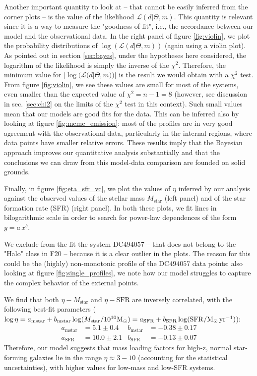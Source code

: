 Another important quantity to look at -- that cannot be easily inferred from the corner plots -- is the value of the likelihood $\mathcal{L}(d|\Theta,m)$. This quantity is relevant since it is a way to measure the "goodness of fit", i.e., the accordance between our model and the observational data. In the right panel of figure \ref{fig:violin}, we plot the probability distributions of $\log(\mathcal{L}(d|\Theta,m))$ (again using a violin plot). As pointed out in section \ref{sec:bayes}, under the hypotheses here considered, the logarithm of the likelihood is simply the inverse of the $\chi^2$. Therefore, the minimum value for $|\log(\mathcal{L}(d|\Theta,m))|$ is the result we would obtain with a $\chi^2$ test. From figure \ref{fig:violin}, we see these values are small for most of the systems, even smaller than the expected value of $\chi^2=n-1=8$ (however, see discussion in sec. \ref{sec:chi2} on the limits of the $\chi^2$ test in this context). Such small values mean that our models are good fits for the data. This can be inferred also by looking at figure \ref{fig:mcmc_emission}: most of the profiles are in very good agreement with the observational data, particularly in the internal regions, where data points have smaller relative errors. These results imply that the Bayesian approach improves our quantitative analysis substantially and that the conclusions we can draw from this model-data comparison are founded on solid grounds.

Finally, in figure \ref{fig:eta_sfr_vc}, we plot the values of $\eta$ inferred by our analysis against the observed values of the stellar mass $M_\mathrm{star}$ (left panel) and of the star formation rate (SFR) (right panel). In both these plots, we fit lines in bilogarithmic scale in order to search for power-law dependences of the form $y=a\,x^b$. 

We exclude from the fit the system DC$494057$ -- that does not belong to the "\CII Halo" class in F20 \citep{Fujimoto:2020qzo} -- because it is a clear outlier in the plots.
%
The reason for this could be the (highly) non-monotonic profile of the DC$494057$ data points: also looking at figure \ref{fig:single_profiles}, we note how our model struggles to capture the complex behavior of the external points. 

We find that both $\eta-M_\mathrm{star}$ and $\eta-\mathrm{SFR}$ are inversely correlated, with the following best-fit parameters ($\log \eta = a_\mathrm{mstar} + b_\mathrm{mstar} \log( M_\mathrm{star}/10^{10}{\rm M}_{\odot}) =  a_\mathrm{SFR} + b_\mathrm{SFR} \log( \mathrm{SFR} /{\rm M}_{\odot}\,\mathrm{yr}^{-1})$):
\begin{align}
    a_\mathrm{mstar} &= 5.1\pm0.4 & b_\mathrm{mstar} &= -0.38\pm0.17      \\
    a_\mathrm{SFR} &= 10.0\pm2.1 & b_\mathrm{SFR} &= -0.13\pm0.07
\end{align}
Therefore, our model suggests that mass loading factors for high-z, normal star-forming galaxies lie in the range $\eta\approx3-10$ (accounting for the statistical uncertainties), with higher values for low-mass and low-SFR systems.


